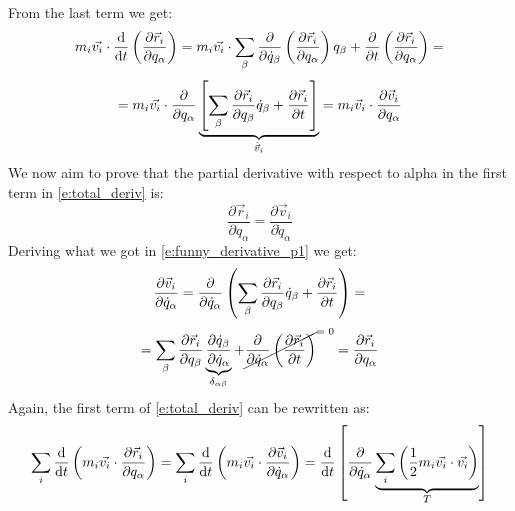 From the last term we get:
\begin{equation}
    m_i\vec{v_i} \cdot \dfrac{\mathrm{d} }{\mathrm{d}t}\left(\dfrac{\partial \vec{r}_i}{\partial q_{\alpha}}\right) = m_i\vec{v_i} \cdot \displaystyle\sum_{\beta} \dfrac{\partial}{\partial \dot{q}_{\beta} }\left(\dfrac{\partial \vec{r}_i}{\partial q_{\alpha}}\right) q_{\beta} + \dfrac{\partial}{\partial t}\left(\dfrac{\partial \vec{r}_i}{\partial q_{\alpha}}\right) =
\end{equation}
\begin{equation} \label{e:funny_derivative_p1}
    = m_i\vec{v_i} \cdot \dfrac{\partial}{\partial q_{\alpha} }\underbrace{\left[\displaystyle\sum_{\beta} \dfrac{\partial \vec{r}_i}{\partial q_{\beta}} \dot{q}_{\beta} + \dfrac{\partial \vec{r}_i}{\partial t}\right]}_{\dot{\vec{v}}_i} = m_i\vec{v}_i \cdot \dfrac{\partial \vec{v}_i}{\partial q_{\alpha}}
\end{equation}
We now aim to prove that the partial derivative with respect to alpha in the first term in \eqref{e:total_deriv} is:
\begin{equation}
    \dfrac{\partial \vec{r}_i}{\partial q_{\alpha}} = \dfrac{\partial \vec{v}_i}{\partial \dot{q}_{\alpha}}
\end{equation}
Deriving what we got in \eqref{e:funny_derivative_p1} we get:
\begin{equation}
    \dfrac{\partial \vec{v}_i}{\partial \dot{q}_{\alpha}} = \dfrac{\partial }{\partial \dot{q}_{\alpha}} \left(\displaystyle\sum_{\beta}\dfrac{\partial \vec{r}_i}{\partial q_{\beta}} \dot{q}_{\beta} + \dfrac{\partial \vec{r}_i}{\partial t}\right) =
\end{equation}
\begin{equation}
     = \bigsum_{\beta}\dfrac{\partial \vec{r}_i}{\partial q_{\beta}} \underbrace{\dfrac{\partial \dot{q}_{\beta}}{\partial \dot{q}_{\alpha}}}_{\delta_{\alpha \beta}}  + \crossout{\dfrac{\partial }{\partial \dot{q}_{\alpha}}\brackets{\dfrac{\partial \vec{r}_i}{\partial t}}} = \dfrac{\partial \vec{r}_i}{\partial q_{\alpha}}
\end{equation}
Again, the first term of \eqref{e:total_deriv} can be rewritten as:
\begin{equation}
    \displaystyle\sum_i \dfrac{\mathrm{d} }{\mathrm{d}t}\left(m_i\vec{v_i} \cdot \dfrac{\partial \vec{r}_i}{\partial q_{\alpha}}\right) = \displaystyle\sum_i\dfrac{\mathrm{d} }{\mathrm{d}t}\left(m_i\vec{v_i} \cdot \dfrac{\partial \vec{v}_i}{\partial \dot{q}_{\alpha}}\right) = \dfrac{\mathrm{d} }{\mathrm{d}t}\left[\dfrac{\partial }{\partial \dot{q}_{\alpha}} \underbrace{\displaystyle\sum_i \left(\dfrac{1}{2}m_i \vec{v_i} \cdot \vec{v_i}\right)}_{T}\right]
\end{equation}
